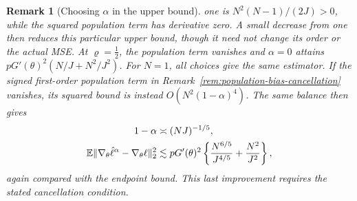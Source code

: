 \documentclass[11pt]{article}
\newtheorem{remark}{Remark}%
\theoremstyle{thmstylethree}%
\begin{document}
\begin{remark}[Choosing $\alpha$ in the upper bound]
{one is $N^2(N-1)/(2J)>0$, while the squared population term has
derivative zero. A small decrease from one then reduces this
particular upper bound, though it need not change its order or the
actual MSE.
\endgraf
At $\varrho=\tfrac12$, the population term vanishes and $\alpha=0$
attains $pG'(\theta)^2(N/J+N^2/J^2)$. For $N=1$, all choices give
the same estimator. If the signed first-order population term in
Remark~\ref{rem:population-bias-cancellation} vanishes, its squared
bound is instead $O(N^2(1-\alpha)^4)$. The same balance then gives
\begin{align}
1-\alpha&\asymp(NJ)^{-1/5},\notag\\
\mathbb{E}\|\nabla_\theta\hat\ell^\alpha-\nabla_\theta\ell\|_2^2
&\lesssim pG'(\theta)^2
\left\{\frac{N^{6/5}}{J^{4/5}}+\frac{N^2}{J^2}\right\},
\label{eq:alpha-tuning-signed-cancellation}
\end{align}
again compared with the endpoint bound. This last improvement requires
the stated cancellation condition.}
\end{remark}
\end{document}
